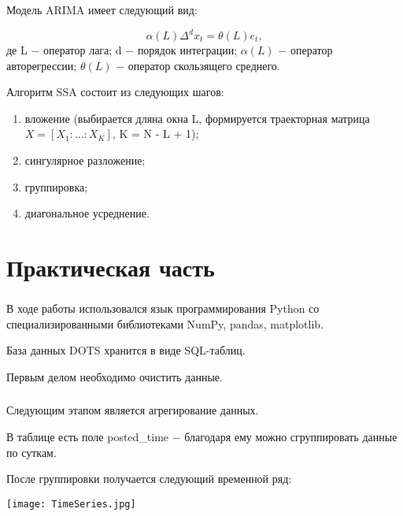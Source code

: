 \documentclass[c]{beamer}
\begin{document}
\begin{frame}
	\frametitle{\insertsection}
	Модель ARIMA имеет следующий вид:

	\[
		\alpha(L)\Delta^{d}x_{t} = \theta(L)e_{t},
	\]
	\noindent де L $-$ оператор лага; d $-$ порядок интеграции; $\alpha(L)$ $-$ оператор авторегрессии; $\theta(L)$ $-$ оператор скользящего среднего.\pause

	Алгоритм SSA состоит из следующих шагов:\pause

	\begin{enumerate}
		\item вложение (выбирается дляна окна L, формируется траекторная матрица $X = [X_{1} : \dots: X_{K}]$, K = N - L + 1);\pause
		\item сингулярное разложение;\pause
		\item группировка;\pause
		\item диагональное усреднение.
	\end{enumerate}	
	
\end{frame}

\section{Практическая часть}

\begin{frame}
	\frametitle{\insertsection}
	
	В ходе работы использовался язык программирования Python со специализированными библиотеками NumPy, pandas, matplotlib.\pause
	
	База данных DOTS хранится в виде SQL-таблиц.\pause
	
	Первым делом необходимо очистить данные.	
	
\end{frame}

\begin{frame}
	\frametitle{\insertsection}
	
	Следующим этапом является агрегирование данных.\pause
	
	В таблице есть поле posted\_time $-$ благодаря ему можно сгруппировать данные по суткам.\pause
	
	После группировки получается следующий временной ряд:	
	
  	\centering\texttt{[image: TimeSeries.jpg]}

\end{frame}
\end{document}
